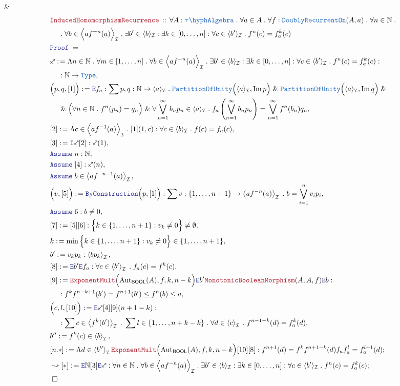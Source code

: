 \documentclass[12pt]{scrartcl}
\newcommand{\TYPE}[1]{\textcolor{NavyBlue}{\mathtt{#1}}}
\newcommand{\LOGIC}[1]{\textcolor{Blue}{\mathtt{#1}}}
\newcommand{\THM}[1]{\textcolor{Maroon}{\mathtt{#1}}}
\renewcommand{\.}{\; . \;}
\newcommand{\de}{: \kern 0.1pc =}
\newcommand{\Theorem}[2]{& \THM{#1} \, :: \, #2 \\ & \Proof = \\ }
\newcommand{\NewLine}{\\ & \kern 1pc}
\newcommand{\Page}[1]{ \begin{align*} #1 \end{align*}   }
\renewcommand{\And}{\; \& \;}
\newcommand{\Intro}{\LOGIC{I}}
\newcommand{\Elim}{\LOGIC{E}}
\newcommand{\Type}{\TYPE{Type}}
\newcommand{\Nat}{\mathbb{N} }
\DeclareMathOperator*{\im}{Im}
\newcommand{\Aut}{\mathrm{Aut}}
\newcommand{\Say}[3]{& #1 \de #2 : #3, \\}
\newcommand{\SayIn}[3]{& #1 \de #2 \in #3, \\}
\newcommand{\Conclude}[3]{& #1 \de #2 : #3; \\}
\newcommand{\DeriveConclude}[3]{& \leadsto #1 \de #2 : #3 ; \\}
\newcommand{\Assume}[2]{& \LOGIC{Assume} \; #1 : #2, \\}
\newcommand{\AssumeIn}[2]{& \LOGIC{Assume} \; #1 \in #2, \\}
\newcommand{\QED}{\; \square}
\newcommand{\EndProof}{& \QED \\}
\newcommand{\Proof}{\LOGIC{Proof} \; }
\newcommand{\genIdeal}[1]{\left\langle #1 \right\rangle_\mathcal{I}}
\newcommand{\I}{\mathcal{I}}
\newcommand{\PoU}{\TYPE{PartitionOfUnity}}
\newcommand{\TAlgebra}{\TYPE{\tau\hyph Algebra}}
\newcommand{\BOOL}{\mathsf{BOOL}}
\begin{document}
{{ 	}
 	\EndProof
}\Page{
	\Theorem{InducedHomomorphismRecurrence}
	{
		\forall A : \TAlgebra \.
		\forall a \in A \. 
		\forall f : \TYPE{DoublyRecurrentOn}(A,a) \.
		\forall n \in \Nat \. \NewLine \.
		\forall b \in \Big\langle a f^{-n}(a) \Big\rangle_\I \.
		\exists b' \in \langle b \rangle_\I :
		\exists k \in [0,\ldots,n] : 
		\forall c \in \langle b' \rangle_\I \.
		f^n(c) = f_a^k(c)
	}
	\Say{\sagittarius}
	{
		\Lambda n \in \Nat \.
		\forall m \in [1,\ldots,n] \. 
		\forall b \in \Big\langle a f^{-n}(a) \Big\rangle_\I \.
		\exists b' \in \langle b \rangle_\I :
		\exists k \in [0,\ldots,n] : 
		\forall c \in \langle b' \rangle_\I \.
		f^n(c) = f_a^k(c)	
	}{ \NewLine : \Nat \to \Type}
	\Say{\Big(p,q,[1] \Big)}{\Elim f_a}
	{
		\sum p,q : \Nat \to \langle a \rangle_\I \.
		\PoU\Big(\langle a \rangle_\I,\im p\Big)
		\And
		\PoU\Big(\langle a \rangle_\I,\im q\Big)
		\And \NewLine \And
		\Big(\forall n \in \Nat \. f^n(p_n) = q_n \Big)
		\And 
		\forall \bigvee^\infty_{n=1} b_n p_n  \in \langle a \rangle_\I\.
		f_a\left( \bigvee^\infty_{n=1} b_n p_n \right) = \bigvee^\infty_{n=1} f^n(b_n) q_n
	}	
	\Say{[2]}
	{
		\Lambda c \in \Big\langle a f^{-1}(a) \Big\rangle_\I \. [1](1,c)
	}
	{
		\forall c \in \langle b \rangle_\I \.
		f(c) = f_a(c)
	}
	\Say{[3]}{\Intro \sagittarius [2]}{\sagittarius(1)}
	\Assume{n}{\Nat}
	\Assume{[4]}{\sagittarius(n)}
	\AssumeIn{b}{\genIdeal{af^{-n-1}(a)}}
	\Say{\Big( v, [5] \Big)}{\LOGIC{ByConstruction}\Big( p, [1]\Big)}
	{
		\sum v : \{1,\ldots,n + 1\} \to \genIdeal{af^{-n}(a)} \. 
		b = \bigvee^n_{i=1} v_i p_i
	}
	\Assume{6}{b \neq 0}
	\Say{[7]}{[5][6]}{\Big\{ k \in \{1,\ldots,n + 1\} : v_k \neq 0  \Big\} \neq \emptyset}
	\SayIn{k}{\min \Big\{ k \in \{1,\ldots,n + 1\} : v_k \neq 0  \Big\} }{\{1,\ldots,n +1\} } 
	\Say{b'}{ v_kp_k}{\genIdeal{bp_k}}
	\Say{[8]}{\Elim b' \Elim f_a}{\forall c \in \genIdeal{b'} \. f_a(c) = f^{k}(c)}
	\Say{[9]}{
		\THM{ExponentMult}\Big( \Aut_\BOOL(A), f, k, n - k \Big)
		\Elim b' \THM{MonotonicBooleanMorphism}(A,A,f)
		\Elim b	
	}{
		\NewLine :		
		f^k f^{n-k+1}(b') = f^{n+1}(b') 
		\le f^n(b) 
		\le a 
	}
	\Say{\Big(c, l, [10]\Big)}{\Elim \sagittarius [4][9](n + 1 - k)}
	{
		\NewLine :		
		\sum c \in \genIdeal{f^{k}(b')} \.
		\sum l \in \{1, \ldots, n + k - k \} \.
		\forall d \in \genIdeal{c} \.
		f^{n-1-k}(d) = f_a^k(d)		
	}
	\SayIn{b''}{f^{k}(c)}{\genIdeal{b}}
	\Conclude{[n.*]}{
		\Lambda d \in \genIdeal{b''}
		\THM{ExponentMult}\Big( \Aut_\BOOL(A), f, k, n - k \Big)
		[10][8]
	}
	{
		 f^{n+1}(d) = 
		 f^k f^{n+1 - k}(d)
		 f_a f_a^{l} = f_a^{l+1}(d)
	}
	\DeriveConclude{[*]}{\Elim \Nat [3] \Elim \sagittarius}
	{
		\forall n \in \Nat \. 
		\forall b \in \Big\langle a f^{-n}(a) \Big\rangle_\I \.
		\exists b' \in \langle b \rangle_\I :
		\exists k \in [0,\ldots,n] : 
		\forall c \in \langle b' \rangle_\I \.
		f^n(c) = f_a^k(c)
	}
	\EndProof
}
\end{document}
